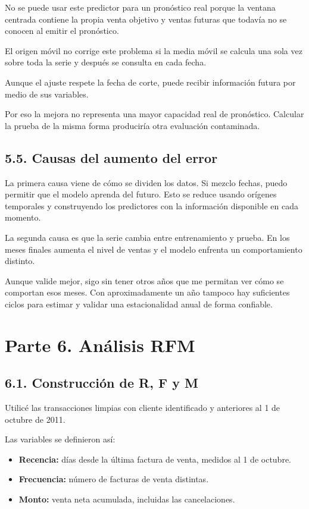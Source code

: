 \documentclass[11pt,letterpaper]{article}
\begin{document}
No se puede usar este predictor para un pronóstico real porque la ventana centrada contiene la propia venta objetivo y ventas futuras que todavía no se conocen al emitir el pronóstico.

El origen móvil no corrige este problema si la media móvil se calcula una sola vez sobre toda la serie y después se consulta en cada fecha.

Aunque el ajuste respete la fecha de corte, puede recibir información futura por medio de sus variables.

Por eso la mejora no representa una mayor capacidad real de pronóstico. Calcular la prueba de la misma forma produciría otra evaluación contaminada.

\subsection*{5.5. Causas del aumento del error}

La primera causa viene de cómo se dividen los datos. Si mezclo fechas, puedo permitir que el modelo aprenda del futuro. Esto se reduce usando orígenes temporales y construyendo los predictores con la información disponible en cada momento.

La segunda causa es que la serie cambia entre entrenamiento y prueba. En los meses finales aumenta el nivel de ventas y el modelo enfrenta un comportamiento distinto.

Aunque valide mejor, sigo sin tener otros años que me permitan ver cómo se comportan esos meses. Con aproximadamente un año tampoco hay suficientes ciclos para estimar y validar una estacionalidad anual de forma confiable.

\section*{Parte 6. Análisis RFM}

\subsection*{6.1. Construcción de R, F y M}

Utilicé las transacciones limpias con cliente identificado y anteriores al 1 de octubre de 2011.

Las variables se definieron así:
\begin{itemize}
    \item \textbf{Recencia:} días desde la última factura de venta, medidos al 1 de octubre.
    \item \textbf{Frecuencia:} número de facturas de venta distintas.
    \item \textbf{Monto:} venta neta acumulada, incluidas las cancelaciones.
\end{itemize}
\end{document}
